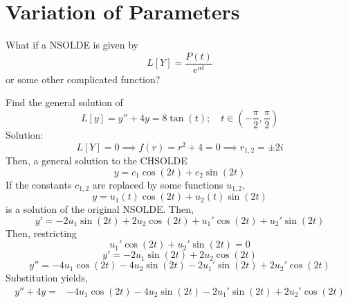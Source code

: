 \documentclass[twoside]{report}
\begin{document}
    \section{Variation of Parameters}
    What if a NSOLDE is given by
    \begin{equation}
        L[Y] = \frac{P(t)}{e^{\alpha t}}
    \end{equation}
    or some other complicated function?
    \begin{example}
        Find the general solution of
        \begin{equation}
            L[y] = y'' + 4y = 8\tan(t);\quad t\in\left(-\frac{\pi}{2}, \frac{\pi}{2}\right)
        \end{equation}
        Solution:
        \begin{equation}
            L[Y] = 0 \implies f(r) = r^{2} + 4 = 0 \implies r_{1,2} = \pm 2i
        \end{equation}
        Then, a general solution to the CHSOLDE
        \begin{equation}
            y = c_{1}\cos(2t) + c_{2}\sin(2t)
        \end{equation}
        If the constants $c_{1,2}$ are replaced by some functions $u_{1,2}$,
        \begin{equation}
            y = u_{1}(t)\cos(2t) + u_{2}(t)\sin(2t)
        \end{equation}
        is a solution of the original NSOLDE. Then,
        \begin{equation}
            y' = -2u_{1}\sin(2t) + 2u_{2}\cos(2t)+u_{1}'\cos(2t)+u_{2}'\sin(2t)
        \end{equation}
        Then, restricting
        \begin{equation}
            u_{1}'\cos(2t) + u_{2}'\sin(2t) = 0
        \end{equation}
        \begin{equation}
            y' = -2u_{1}\sin(2t) + 2u_{2}\cos(2t)
        \end{equation}
        \begin{equation}
            y'' = -4u_{1}\cos(2t)-4u_{2}\sin(2t)-2u_{1}'\sin(2t)+2u_{2}'\cos(2t)
        \end{equation}
        Substitution yields,
        \begin{equation}
            \begin{alignedat}{1}
                y'' + 4y = &-4u_{1}\cos(2t) - 4u_{2}\sin(2t)-2u_{1}'\sin(2t)+2u_{2}'\cos(2t)\\

\end{alignedat}
\end{equation}
\end{example}
\end{document}
